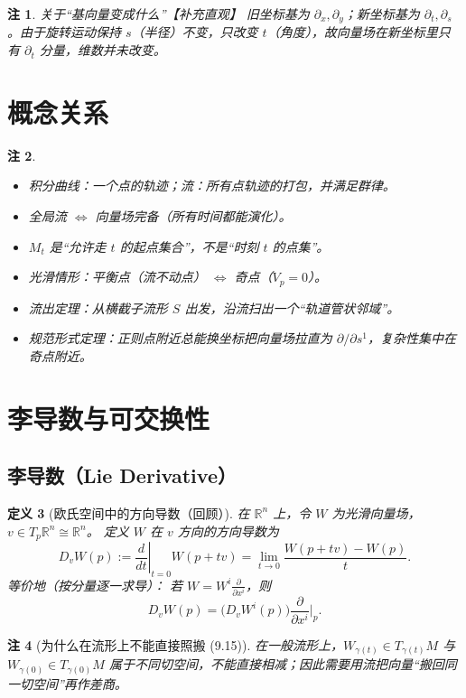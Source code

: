 \documentclass[11pt]{article}
\newtheorem{definition}{定义}[section]
\newtheorem{remark}[definition]{注}
\newcommand{\R}{\mathbb{R}}
\begin{document}
\begin{remark}关于“基向量变成什么”【补充直观】
旧坐标基为 $\partial_x,\partial_y$；新坐标基为 $\partial_t,\partial_s$。由于旋转运动保持 $s$（半径）不变，只改变 $t$（角度），故向量场在新坐标里只有 $\partial_t$ 分量，维数并未改变。
\end{remark}

\section{概念关系}

\begin{remark}
\begin{itemize}
\item 积分曲线：一个点的轨迹；流：所有点轨迹的打包，并满足群律。
\item 全局流 $\Leftrightarrow$ 向量场完备（所有时间都能演化）。
\item $M_t$ 是“允许走 $t$ 的起点集合”，不是“时刻 $t$ 的点集”。
\item 光滑情形：平衡点（流不动点） $\Leftrightarrow$ 奇点（$V_p=0$）。
\item 流出定理：从横截子流形 $S$ 出发，沿流扫出一个“轨道管状邻域”。
\item 规范形式定理：正则点附近总能换坐标把向量场拉直为 $\partial/\partial s^1$，复杂性集中在奇点附近。
\end{itemize}
\end{remark}

\section{李导数与可交换性}

\subsection{李导数（Lie Derivative）}

\begin{definition}[欧氏空间中的方向导数（回顾）]
在 $\R^n$ 上，令 $W$ 为光滑向量场，$v\in T_p\R^n\cong \R^n$。
定义 $W$ 在 $v$ 方向的方向导数为
\[
D_vW(p):=\left.\frac{d}{dt}\right|_{t=0}W(p+tv)
=\lim_{t\to 0}\frac{W(p+tv)-W(p)}{t}.
\tag{9.15}
\]
等价地（按分量逐一求导）：
若 $W=W^i\frac{\partial}{\partial x^i}$，则
\[
D_vW(p)=\bigl(D_vW^i(p)\bigr)\frac{\partial}{\partial x^i}\Big|_p.
\]
\end{definition}

\begin{remark}[为什么在流形上不能直接照搬 (9.15)]
在一般流形上，$W_{\gamma(t)}\in T_{\gamma(t)}M$ 与 $W_{\gamma(0)}\in T_{\gamma(0)}M$
属于不同切空间，不能直接相减；因此需要用流把向量“搬回同一切空间”再作差商。
\end{remark}
\end{document}
